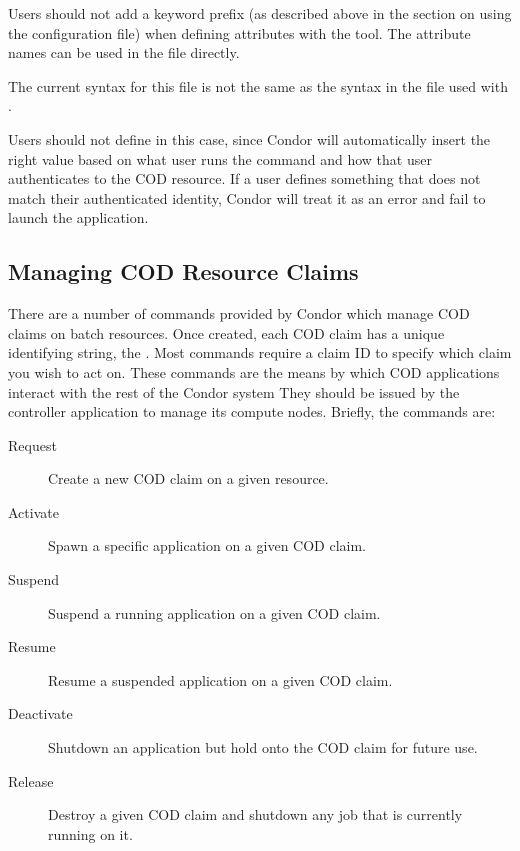 
Users should not add a keyword prefix (as described above in the
section on using the configuration file) when defining attributes with
the  tool.
The attribute names can be used in the file directly.

\Warn The current syntax for this file is not the same as the syntax
in the file used with .

\Note Users should not define  in this case, since Condor
will automatically insert the right value based on what user runs the
 command and how that user authenticates to the
COD resource.
If a user defines something that does not match their authenticated
identity, Condor will treat it as an error and fail to launch the
application.


\subsection{\label{sec:cod-managing-claims}
Managing COD Resource Claims}

There are a number of commands provided by Condor which manage COD
claims on batch resources.
Once created, each COD claim has a unique identifying string, the
.
Most commands require a claim ID to specify which claim you wish to
act on. 
These commands are the means by which COD applications interact with
the rest of the Condor system
They should be issued by the controller application to manage its
compute nodes.
Briefly, the commands are:

\begin{description}

\item [Request] Create a new COD claim on a given resource.

\item [Activate] Spawn a specific application on a given COD claim.

\item [Suspend] Suspend a running application on a given COD claim.

\item [Resume] Resume a suspended application on a given COD claim.

\item [Deactivate] Shutdown an application but hold onto the COD claim
  for future use.

\item [Release] Destroy a given COD claim and shutdown any job that is
  currently running on it.

\end{description}

